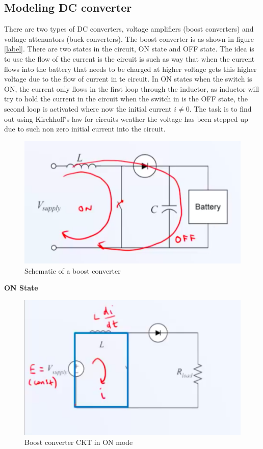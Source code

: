 \subsection{Modeling DC converter}

There are two types of DC converters, voltage amplifiers (boost converters) and voltage attenuators (buck converters). The boost converter is as shown in figure \ref{label}. There are two states in the circuit, ON state and OFF state. The idea is to use the flow of the current is the circuit is such as way that when the current flows into the battery that needs to be charged at higher voltage gets this higher voltage due to the flow of current in te circuit. In ON states when the switch is ON, the current only flows in the first loop through the inductor, as inductor will try to hold the current in the circuit when the switch in is the OFF state, the second loop is activated where now the initial current $i \neq 0$. The task is to find out using Kirchhoff's law for circuits weather the voltage has been stepped up due to such non zero initial current into the circuit.

\begin{figure}[h!]
	\centering
	\includegraphics[width=0.75\linewidth]{Bilder/Fund_ELK_Boost}
	\caption{Schematic of a boost converter}
	\label{Fig_Fund_ELK_Boost}
\end{figure}

\textbf{ON State}

\begin{figure}[h!]
	\centering
	\includegraphics[width=0.75\linewidth]{Bilder/Fund_ELK_Boost_ON}
	\caption{Boost converter CKT in ON mode}
	\label{Fig_Fund_ELK_Boost_ON}
\end{figure}

